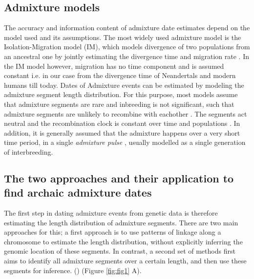 \documentclass[]{article}
\begin{document}
\subsection{Admixture models}\label{Admixture models}

The accuracy and information content of admixture date estimates depend on the model used and its assumptions. The most widely used admixture model is the Isolation-Migration model (IM), which models divergence of two populations from an ancestral one by jointly estimating the divergence time and migration rate \citep{nielsen_distinguishing_2001,hey_multilocus_2004}. In the IM model however, migration has no time component and is assumed constant i.e. in our case from the divergence time of Neandertals and modern humans till today. Dates of Admixture events can be estimated by modeling the admixture segment length distribution. For this purpose, most models assume that admixture segments are rare and inbreeding is not significant, such that admixture segments are unlikely to recombine with eachother \citep{pool_inference_2009,liang_lengths_2014}. The segments act neutral \citep{shchur_distribution_2019} and the recombination clock is constant over time and populations \citep{gravel_population_2012}. In addition, it is generally assumed that the admixture happens over a very short time period, in a single \textit{admixture pulse} \citep{moorjani_history_2011}, usually modelled as a single generation of interbreeding.


\subsection{The two approaches and their application to find archaic admixture dates}\label{the-two-approaches-and-their-application-to-find-archaic-admixture-dates}

The first step in dating admixture events from genetic data is therefore estimating the length distribution of admixture segments.  There are two main approaches for this; a first approach is to use patterns of linkage along a chromosome to estimate the length distribution, without explicitly inferring the genomic location of these segments. In contrast, a second set of methods first aims to identify all admixture segments over a certain length, and then use these segments for inference. 
(\citep{chimusa_dating_2018}) (Figure \ref{fig:fig1} A).
\end{document}
